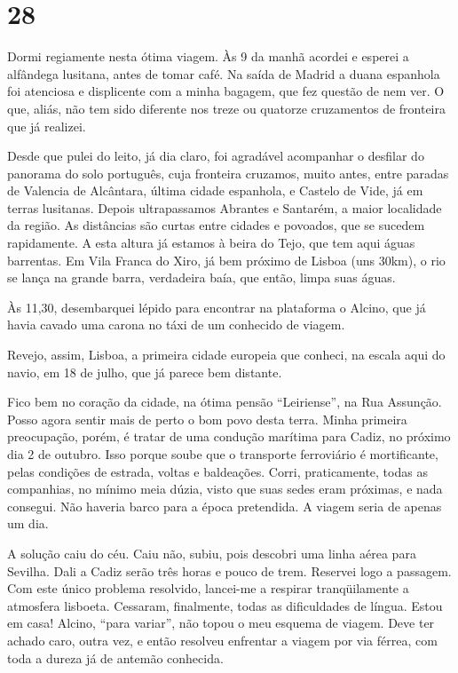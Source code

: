 \section*{28 \adfflatleafright {}}
Dormi regiamente nesta ótima viagem. Às 9 da manhã acordei e esperei a alfândega lusitana, antes de tomar café. Na saída de Madrid a duana espanhola foi atenciosa e displicente com a minha bagagem, que fez questão de nem ver. O que, aliás, não tem sido diferente nos treze ou quatorze cruzamentos de fronteira que já realizei.

Desde que pulei do leito, já dia claro, foi agradável acompanhar o desfilar do panorama do solo português, cuja fronteira cruzamos, muito antes, entre paradas de Valencia de Alcântara, última cidade espanhola, e Castelo de Vide, já em terras lusitanas. Depois ultrapassamos Abrantes e Santarém, a maior localidade da região. As distâncias são curtas entre cidades e povoados, que se sucedem rapidamente. A esta altura já estamos à beira do Tejo, que tem aqui águas barrentas. Em Vila Franca do Xiro, já bem próximo de Lisboa (uns 30km), o rio se lança na grande barra, verdadeira baía, que então, limpa suas águas.

Às 11,30, desembarquei lépido para encontrar na plataforma o Alcino, que já havia cavado uma carona no táxi de um conhecido de viagem.

Revejo, assim, Lisboa, a primeira cidade europeia que conheci, na escala aqui do navio, em 18 de julho, que já parece bem distante.

Fico bem no coração da cidade, na ótima pensão ``Leiriense'', na Rua Assunção. Posso agora sentir mais de perto o bom povo desta terra. Minha primeira preocupação, porém, é tratar de uma condução marítima para Cadiz, no próximo dia 2 de outubro. Isso porque soube que o transporte ferroviário é mortificante, pelas condições de estrada, voltas e baldeações. Corri, praticamente, todas as companhias, no mínimo meia dúzia, visto que suas sedes eram próximas, e nada consegui. Não haveria barco para a época pretendida. A viagem seria de apenas um dia.

A solução caiu do céu. Caiu não, subiu, pois descobri uma linha aérea para Sevilha. Dali a Cadiz serão três horas e pouco de trem. Reservei logo a passagem. Com este único problema resolvido, lancei-me a respirar tranqüilamente a atmosfera lisboeta. Cessaram, finalmente, todas as dificuldades de língua. Estou em casa! Alcino, ``para variar'', não topou o meu esquema de viagem. Deve ter achado caro, outra vez, e então resolveu enfrentar a viagem por via férrea, com toda a dureza já de antemão conhecida.

